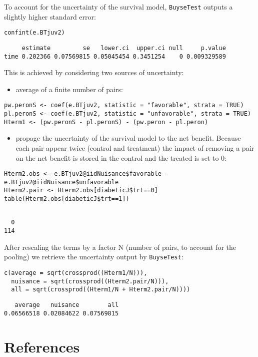 \documentclass[12pt]{article}
\begin{document}
\clearpage 

To account for the uncertainty of the survival model, \texttt{BuyseTest}
outputs a slightly higher standard error:
\lstset{language=r,label= ,caption= ,captionpos=b,numbers=none}
\begin{lstlisting}
confint(e.BTjuv2)
\end{lstlisting}

\begin{verbatim}
     estimate         se   lower.ci  upper.ci null     p.value
time 0.202366 0.07569815 0.05045454 0.3451254    0 0.009329589
\end{verbatim}


This is achieved by considering two sources of uncertainty:
\begin{itemize}
\item average of a finite number of pairs:
\end{itemize}
\lstset{language=r,label= ,caption= ,captionpos=b,numbers=none}
\begin{lstlisting}
pw.peronS <- coef(e.BTjuv2, statistic = "favorable", strata = TRUE)
pl.peronS <- coef(e.BTjuv2, statistic = "unfavorable", strata = TRUE)
Hterm1 <- (pw.peronS - pl.peronS) - (pw.peron - pl.peron)
\end{lstlisting}

\begin{itemize}
\item propage the uncertainty of the survival model to the net
benefit. Because each pair appear twice (control and treatment) the
impact of removing a pair on the net benefit is stored in the
control and the treated is set to 0:
\end{itemize}
\lstset{language=r,label= ,caption= ,captionpos=b,numbers=none}
\begin{lstlisting}
Hterm2.obs <- e.BTjuv2@iidNuisance$favorable - e.BTjuv2@iidNuisance$unfavorable
Hterm2.pair <- Hterm2.obs[diabeticJ$trt==0]
table(Hterm2.obs[diabeticJ$trt==1])
\end{lstlisting}

\begin{verbatim}

  0 
114
\end{verbatim}


After rescaling the terms by a factor N (number of pairs, to account
for the pooling) we retrieve the uncertainty output by \texttt{BuyseTest}:
\lstset{language=r,label= ,caption= ,captionpos=b,numbers=none}
\begin{lstlisting}
c(average = sqrt(crossprod((Hterm1/N))),
  nuisance = sqrt(crossprod((Hterm2.pair/N))),
  all = sqrt(crossprod((Hterm1/N + Hterm2.pair/N))))
\end{lstlisting}

\begin{verbatim}
   average   nuisance        all 
0.06566518 0.02084622 0.07569815
\end{verbatim}



\section*{References}
\label{sec:org1ce013e}
\begingroup
\renewcommand{\section}[2]{}




\endgroup
\end{document}

